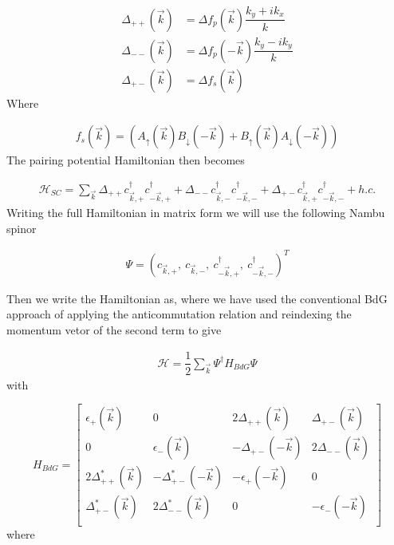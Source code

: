 \begin{align}
  \Delta_{++}(\vec{k}) &= \Delta f_p(\vec{k}) \dfrac{k_y +i k_x}{k} \\
  \Delta_{--}(\vec{k}) &= \Delta f_p(-\vec{k}) \dfrac{k_y -i k_y}{k} \\
  \Delta_{+-}(\vec{k}) &= \Delta f_s(\vec{k})
\end{align}
Where

\begin{align}
  f_s(\vec{k}) = \left(A_{\uparrow}(\vec{k})B_{\downarrow}(-\vec{k})+B_{\uparrow}(\vec{k})A_{\downarrow}(-\vec{k})\right)
\end{align}
The pairing potential Hamiltonian then becomes

\begin{align}
  \mathcal{H}_{SC} = \sum_{\vec{k}} \Delta_{++}c_{\vec{k},+}^{\dagger}c_{-\vec{k},+}^{\dagger} + \Delta_{--}c_{\vec{k},-}^{\dagger}c_{-\vec{k},-}^{\dagger} +\Delta_{+-}c_{\vec{k},+}^{\dagger}c_{-\vec{k},-}^{\dagger} + h.c.
\end{align}
Writing the full Hamiltonian in matrix form we will use the following Nambu spinor

\begin{align}
  \Psi = (c_{\vec{k},+},\ c_{\vec{k},-},\ c_{-\vec{k},+}^{\dagger},\ c_{-\vec{k},-}^{\dagger} )^T
\end{align}

Then we write the Hamiltonian as, where we have used the conventional BdG approach of applying the anticommutation relation and reindexing the momentum vetor of the second term to give

\begin{align}
  \mathcal{H} = \dfrac{1}{2}\sum_{\vec{k}} \Psi^{\dagger}H_{BdG}\Psi
\end{align}
with

\begin{equation}
  H_{BdG} =
  \begin{bmatrix}
    \epsilon_+(\vec{k}) & 0 & 2\Delta_{++}(\vec{k}) & \Delta_{+-}(\vec{k}) \\
    0 & \epsilon_-(\vec{k}) & -\Delta_{+-}(-\vec{k}) & 2\Delta_{--}(\vec{k}) \\
    2\Delta_{++}^*(\vec{k}) & -\Delta_{+-}^*(-\vec{k}) & -\epsilon_+(-\vec{k}) & 0 \\
    \Delta_{+-}^*(\vec{k}) & 2\Delta_{--}^*(\vec{k}) & 0 & -\epsilon_-(-\vec{k}) \\
  \end{bmatrix}
\end{equation}
where

